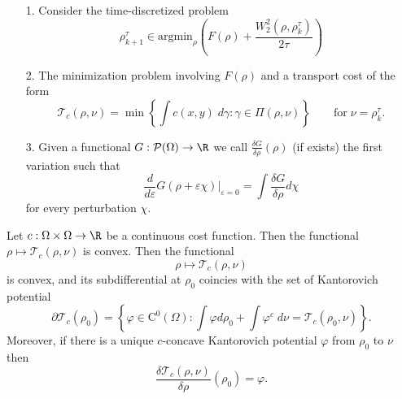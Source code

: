 \begin{enumerate}
    \item[1.] Consider the time-discretized problem
    \begin{equation}\label{eq:Minimize_measures}
        \rho^\tau_{k+1} \in \mathrm{argmin}_{\rho} \left(F(\rho) + \frac{W_2^2(\rho, \rho^\tau_k)}{2\tau}\right)
    \end{equation}
    \item[2.] The minimization problem involving $F(\rho)$ and a transport cost of the form
    \begin{equation*}
        \mathcal{T}_c(\rho, \nu) = \min \left\lbrace \int c(x,y)\;d\gamma: \gamma\in \Pi(\rho,\nu) \right\rbrace \qquad\text{for}\;\nu = \rho^\tau_k.
    \end{equation*}
    \item[3.] Given a functional $G:\mathcal{P}(\Omega)\to \R$ we call $\frac{\delta G}{\delta \rho}(\rho)$ (if exists) the first variation such that
    \begin{equation*}
        \frac{d}{d\varepsilon} G(\rho+\varepsilon\chi)|_{\varepsilon = 0} = \int \frac{\delta G}{\delta \rho}d\chi
    \end{equation*}
    for every perturbation $\chi$.
\end{enumerate}
\begin{prop} Let $c:\Omega\times \Omega \to \R$ be a continuous cost function. Then the functional $\rho \mapsto \mathcal{T}_c(\rho,\nu)$ is convex. Then the functional
\begin{equation*}
    \rho \mapsto \mathcal{T}_c(\rho,\nu)
\end{equation*}
is convex, and its subdifferential at $\rho_0$ coincies with the set of Kantorovich potential
\begin{equation*}
    \partial \mathcal{T}_c(\rho_0) = \left\lbrace \varphi\in \mathrm{C}^0(\Omega): \int \varphi d\rho_0 + \int \varphi^c\;d\nu = \mathcal{T}_c(\rho_0,\nu)\right\rbrace.
\end{equation*}
Moreover, if there is a unique $c$-concave Kantorovich potential $\varphi$ from $\rho_0$  to $\nu$ then
\begin{equation*}
    \frac{\delta \mathcal{T}_c(\rho,\nu)}{\delta \rho}(\rho_0) = \varphi.
\end{equation*}
\end{prop}
